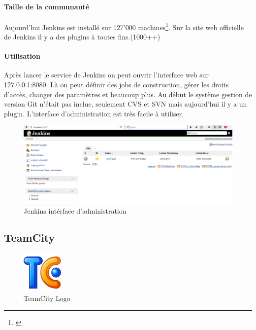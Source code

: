 \paragraph{Taille de la communauté} Aujourd'hui Jenkins est installé sur 127'000 machines\footnote{\citep{jenkinsstats}}. Sur la site web officielle de Jenkins il y a des plugins à toutes fins.(1000++) 
\paragraph{Utilisation} Après lancer le service de Jenkins on peut ouvrir l'interface web sur 127.0.0.1:8080. Là on peut définir des jobs de construction, gérer les droits d'accès, changer des paramètres et beaucoup plus. Au début le système gestion de version Git n'était pas inclue, seulement CVS et SVN mais aujourd'hui il y a un plugin. L'interface d'administration est très facile à utiliser.
\begin{figure}[H]
	\centering
		\includegraphics[width=15cm]{bilder/JenkinsGui}
	\caption{Jenkins intérface d'administration}
	\label{fig:jenkinsgui}
\end{figure}

\clearpage


\subsection{TeamCity}
\begin{figure}
  \begin{center}
    \includegraphics[width=0.18\textwidth]{bilder/teamcity512}
  \end{center}
  \caption{TeamCity Logo}
\end{figure}
